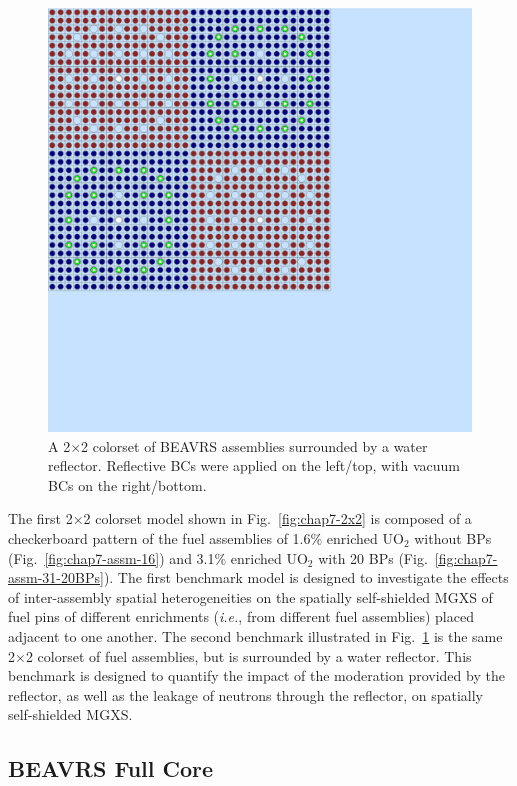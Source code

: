 \begin{figure}[h!]
  \centering
  \includegraphics[width=0.63\linewidth]{figures/benchmarks/reflector}
\vspace{2mm}
\caption[A reflected 2$\times$2 colorset of BEAVRS assemblies]{A 2$\times$2 colorset of BEAVRS assemblies surrounded by a water reflector. Reflective \acp{BC} were applied on the left/top, with vacuum \acp{BC} on the right/bottom.}
\label{fig:chap7-reflector}
\end{figure}

The first 2$\times$2 colorset model shown in Fig.~\ref{fig:chap7-2x2} is composed of a checkerboard pattern of the fuel assemblies of 1.6\% enriched UO$_2$ without \acp{BP} (Fig.~\ref{fig:chap7-assm-16}) and 3.1\% enriched UO$_2$ with 20 \acp{BP} (Fig.~\ref{fig:chap7-assm-31-20BPs}). The first benchmark model is designed to investigate the effects of inter-assembly spatial heterogeneities on the spatially self-shielded \ac{MGXS} of fuel pins of different enrichments (\textit{i.e.}, from different fuel assemblies) placed adjacent to one another. The second benchmark illustrated in Fig.~\ref{fig:chap7-reflector} is the same 2$\times$2 colorset of fuel assemblies, but is surrounded by a water reflector. This benchmark is designed to quantify the impact of the moderation provided by the reflector, as well as the leakage of neutrons through the reflector, on spatially self-shielded \ac{MGXS}.


\subsection{BEAVRS Full Core}
\label{subsec:chap7-full-core}

